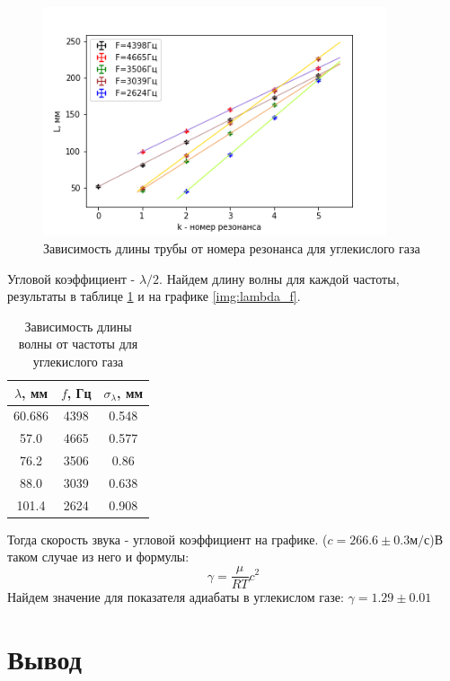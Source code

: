 \documentclass[a4paper,12pt]{article} %
\begin{document}
\begin{figure}[h!]
\begin{center}
\includegraphics[width=0.9\textwidth]{Frequency_co2}
\end{center}
\caption{Зависимость длины трубы от номера резонанса для углекислого газа} \label{частота_co2}
\end{figure} 

Угловой коэффициент - $\lambda/2$. Найдем длину волны для каждой частоты, результаты в таблице \ref{tbl:lambda_f_co2} и на графике \ref{img:lambda_f}.

\begin{table}[h!] \caption{Зависимость длины волны от частоты для углекислого газа} \label{tbl:lambda_f_co2} \begin{tabular}{|c|c|c|} \hline $\lambda$, мм & $f$, Гц & $\sigma_\lambda$, мм \\ \hline 60.686 & 4398 & 0.548 \\ \hline 57.0 & 4665 & 0.577 \\ \hline 76.2 & 3506 & 0.86 \\ \hline 88.0 & 3039 & 0.638 \\ \hline 101.4 & 2624 & 0.908 \\ \hline \end{tabular} \end{table}

Тогда скорость звука - угловой коэффициент на графике. ($c= 266.6 \pm 0.3 м/с$)В таком случае из него и формулы:
\begin{equation}
\gamma = \frac{\mu}{RT}c^2
\end{equation}
Найдем значение для показателя адиабаты в углекислом газе:
$\gamma = 1.29 \pm 0.01$

\section{Вывод}
\end{document}
